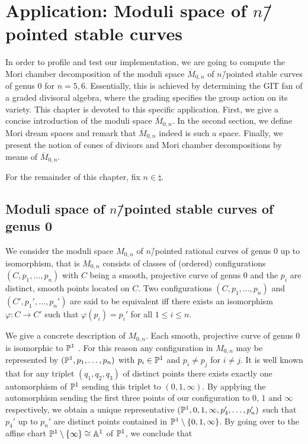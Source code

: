 \chapter{Application: Moduli space of $n$\=/pointed stable curves}
\label{chapter:moduli_space_of_pointed_stable_curves}

In order to profile and test our implementation, we are going to compute the Mori chamber decomposition of the moduli space $\overline{M}_{0,n}$ of $n$\=/pointed stable curves of genus $0$ for $n=5,6$. Essentially, this is achieved by determining the GIT fan of a graded divisoral algebra, where the grading specifies the group action on its variety. This chapter is devoted to this specific application. First, we give a concise introduction of the moduli space $\overline{M}_{0,n}$. In the second section, we define Mori dream spaces and remark that $\overline{M}_{0,n}$ indeed is such a space. Finally, we present the notion of cones of divisors and Mori chamber decompositions by means of $\overline{M}_{0,n}$.

For the remainder of this chapter, fix $n\in\natural$.

\section{Moduli space of $n$\=/pointed stable curves of genus 0}

We consider the moduli space $M_{0,n}$ of $n$\=/pointed rational curves of genus $0$ up to isomorphism, that is $M_{0,n}$ consists of classes of (ordered) configurations $(C,p_1,\dots,p_n)$ with $C$ being a smooth, projective curve of genus $0$ and the $p_i$ are distinct, smooth points located on $C$. Two configurations $(C,p_1,\dots,p_n)$ and $(C',p_1',\dots,p_n')$ are said to be equivalent iff there exists an isomorphism $\varphi: C \longrightarrow C'$ such that $\varphi(p_i) = p_i'$ for all $1\leq i \leq n$.
%

We give a concrete description of $M_{0,n}$. Each smooth, projective curve of genus $0$ is isomorphic to $\mathbb{P}^1$ \cite[Example IV.1.3.5]{hartshorne}. For this reason any configuration in $M_{0,n}$ may be represented by $(\mathbb{P}^1, p_1,\dots,p_n)$ with $p_i\in \mathbb{P}^1$ and $p_i \neq p_j$ for $i\neq j$. It is well known that for any triplet $(q_1, q_2, q_3)$ of distinct points there exists exactly one automorphism of $\mathbb{P}^1$ sending this triplet to $(0,1,\infty)$. By applying the automorphism sending the first three points of our configuration to $0$, $1$ and $\infty$ respectively, we obtain a unique representative $(\mathbb{P}^1, 0, 1, \infty, p_4',\dots,p_n')$ such that $p_4'$ up to $p_n'$ are distinct points contained in $\mathbb{P}^1\setminus\{0,1,\infty\}$. By going over to the affine chart $\mathbb{P}^1\setminus\{\infty\}\cong \mathbb{A}^1$ of $\mathbb{P}^1$, we conclude that

